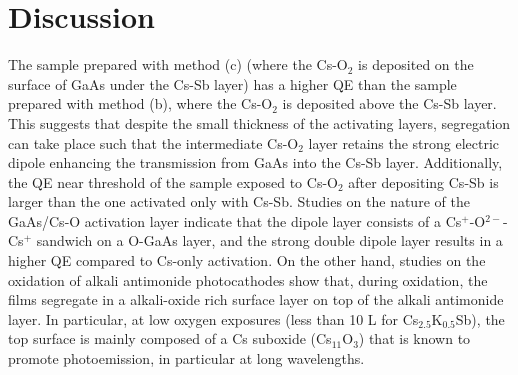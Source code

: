\section{Discussion}

The sample prepared with method (c) (where the Cs-O$_2$ is deposited on the surface of GaAs under the Cs-Sb layer) has a higher QE than the sample prepared with method (b), where the Cs-O$_2$ is deposited above the Cs-Sb layer. This suggests that despite the small thickness of the activating layers, segregation can take place such that the intermediate Cs-O$_2$ layer retains the strong electric dipole enhancing the transmission from GaAs into the Cs-Sb layer.
Additionally, the QE near threshold of the sample exposed to Cs-O$_2$ after depositing Cs-Sb is larger than the one activated only with Cs-Sb.
Studies on the nature of the GaAs/Cs-O activation layer indicate that the dipole layer consists of a Cs$^+$-O$^{2-}$-Cs$^+$ sandwich on a O-GaAs layer, and the strong double dipole layer results in a higher QE compared to Cs-only activation.\cite{su1983} On the other hand, studies on the oxidation of alkali antimonide photocathodes show that, during oxidation, the films segregate in a alkali-oxide rich surface layer on top of the alkali antimonide layer. \cite{soriano1993} In particular, at low oxygen exposures (less than 10 L for Cs$_{2.5}$K$_{0.5}$Sb), \cite{soriano1993} the top surface is mainly composed of a Cs suboxide (Cs$_{11}$O$_3$) \cite{galdiNAPAC} that is known to promote photoemission, in particular at long wavelengths.\cite{bates1981}

